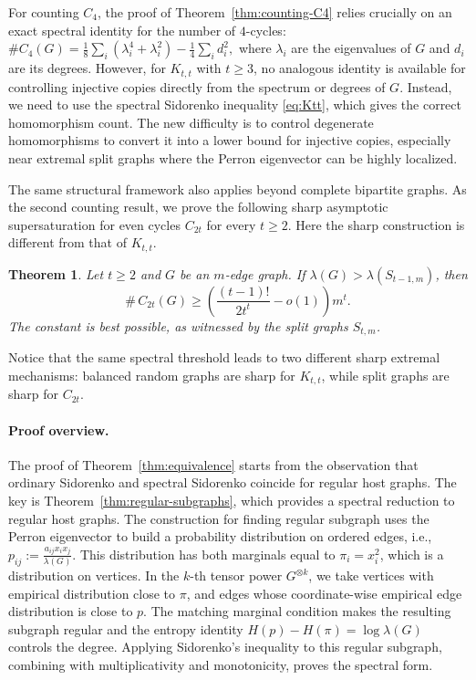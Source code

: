 \documentclass[10pt,a4paper]{amsart}
\newtheorem{theorem}{Theorem}[section]
\begin{document}
For counting \(C_4\), the proof of Theorem~\ref{thm:counting-C4} relies crucially on an
exact spectral identity \cite{LL2009} for the number of \(4\)-cycles:  $\texttt{\#}C_4(G)
        =
        \frac18\sum_i(\lambda_i^4+\lambda_i^2)
        -
        \frac14\sum_i d_i^2,$
where \(\lambda_i\) are the eigenvalues of \(G\) and \(d_i\) are its
degrees. However, for \(K_{t,t}\) with \(t\ge3\), no analogous identity is available for controlling injective copies directly from the spectrum or degrees of $G$.  Instead, we need to use the spectral Sidorenko inequality
\eqref{eq:Ktt}, which gives the correct homomorphism count.  The new difficulty is to control degenerate homomorphisms to convert it into a lower bound for injective copies, especially
near extremal split  graphs where the Perron eigenvector can be highly localized.



The same structural framework also applies beyond complete bipartite graphs. As the second counting result, we prove the following sharp asymptotic supersaturation for even cycles $C_{2t}$ for every $t\ge 2$. Here the sharp construction is different from that of $K_{t,t}$. 

\begin{theorem}\label{thm:sharp-C2t}
 Let $t\ge 2$ and $G$ be an $m$-edge graph. If $\lambda(G)> \lambda(S_{t-1,m})$, then
 \[
   \texttt{\#}\, C_{2t}(G) \ge
   \left( \frac{(t-1)!}{2t^t} - o(1)\right) m^t .
 \]
 The constant is best possible, as witnessed by the split graphs $S_{t,m}$.
 \end{theorem}

Notice that the same spectral threshold leads to two different sharp extremal
mechanisms: balanced random graphs are sharp for \(K_{t,t}\), while split
graphs are sharp for \(C_{2t}\).

\paragraph{Proof overview.}

The proof of Theorem~\ref{thm:equivalence} starts from the observation
that ordinary Sidorenko and spectral Sidorenko coincide for regular host
graphs. The key is Theorem~\ref{thm:regular-subgraphs}, which provides a
spectral reduction to regular host graphs.  The construction for finding regular subgraph uses the Perron eigenvector to build a probability
distribution on ordered edges, i.e., 
        $p_{ij}:=\frac{a_{ij}x_ix_j}{\lambda(G)}.$
This distribution has both marginals equal to \(\pi_i=x_i^2\), which is a distribution on vertices. In the $k$-th tensor power \(G^{\otimes k}\), we take vertices with empirical distribution close to \(\pi\), and edges whose coordinate-wise empirical edge distribution is close to \(p\). The
matching marginal condition makes the resulting subgraph regular and the entropy identity \(H(p)-H(\pi)=\log\lambda(G)\) controls the degree. Applying Sidorenko's inequality to this regular subgraph, combining with multiplicativity and monotonicity, proves the spectral form.
\end{document}
